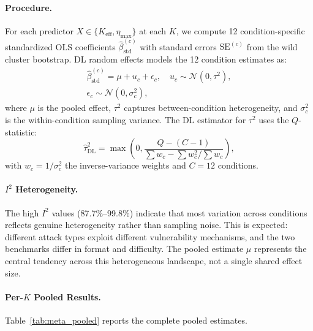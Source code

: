 \paragraph{Procedure.} For each predictor $X \in \{K_{\mathrm{eff}}, \eta_{\max}\}$ at each $K$, we compute 12 condition-specific standardized OLS coefficients $\hat{\beta}_{\mathrm{std}}^{(c)}$ with standard errors $\mathrm{SE}^{(c)}$ from the wild cluster bootstrap. DL random effects models the 12 condition estimates as:
\begin{multline}
\hat{\beta}_{\mathrm{std}}^{(c)} = \mu + u_c + \epsilon_c, \quad u_c \sim \mathcal{N}(0, \tau^2), \\
\epsilon_c \sim \mathcal{N}(0, \sigma_c^2),
\end{multline}
where $\mu$ is the pooled effect, $\tau^2$ captures between-condition heterogeneity, and $\sigma_c^2$ is the within-condition sampling variance. The DL estimator for $\tau^2$ uses the $Q$-statistic:
\begin{equation}
\hat{\tau}^2_{\mathrm{DL}} = \max\!\left(0, \frac{Q - (C-1)}{\sum w_c - \sum w_c^2 / \sum w_c}\right),
\end{equation}
with $w_c = 1/\sigma_c^2$ the inverse-variance weights and $C{=}12$ conditions.

\paragraph{$I^2$ Heterogeneity.} The high $I^2$ values (87.7\%--99.8\%) indicate that most variation across conditions reflects genuine heterogeneity rather than sampling noise. This is expected: different attack types exploit different vulnerability mechanisms, and the two benchmarks differ in format and difficulty. The pooled estimate $\mu$ represents the central tendency across this heterogeneous landscape, not a single shared effect size.

\paragraph{Per-$K$ Pooled Results.} Table~\ref{tab:meta_pooled} reports the complete pooled estimates.

